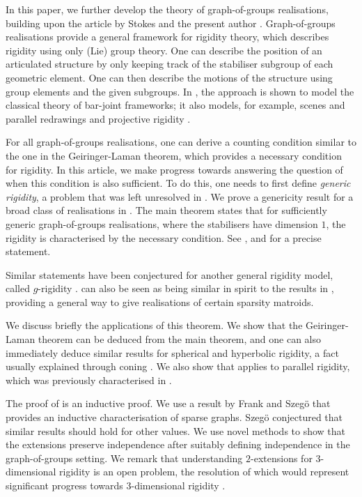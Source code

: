 \documentclass{article}
\theoremstyle{definition}
\theoremstyle{remark}
\begin{document}
In this paper, we further develop the theory of graph-of-groups realisations, building upon the article by Stokes and the present author \cite{graphsofgroups}. Graph-of-groups realisations provide a general framework for rigidity theory, which describes rigidity using only (Lie) group theory. One can describe the position of an articulated structure by only keeping track of the stabiliser subgroup of each geometric element. One can then describe the motions of the structure using group elements and the given subgroups. In \cite{graphsofgroups}, the approach is shown to model the classical theory of bar-joint frameworks; it also models, for example, scenes and parallel redrawings \cite{Whiteley1989} and projective rigidity \cite{https://doi.org/10.48550/arxiv.2407.17836}. 

For all graph-of-groups realisations, one can derive a counting condition similar to the one in the Geiringer-Laman theorem, which provides a necessary condition for rigidity. In this article, we make progress towards answering the question of when this condition is also sufficient. To do this, one needs to first define \textit{generic rigidity}, a problem that was left unresolved in \cite{graphsofgroups}. We prove a genericity result for a broad class of realisations in .
The main theorem states that for sufficiently generic graph-of-groups realisations, where the stabilisers have dimension $1$, the rigidity is characterised by the necessary condition. See , and  for a precise statement. 

Similar statements have been conjectured for another general rigidity model, called $g$-rigidity \cite[Conjecture 4.13]{cruickshank2023identifiability}.   can also be seen as being similar in spirit to the results in \cite{streinu2011natural}, providing a general way to give realisations of certain sparsity matroids. 

We discuss briefly the applications of this theorem. We show that the Geiringer-Laman theorem can be deduced from the main theorem, and one can also immediately deduce similar results for spherical and hyperbolic rigidity, a fact usually explained through coning \cite{whiteley1983cones, schulze2012coning}. We also show that  applies to parallel rigidity, which was previously characterised in \cite{Whiteley1996, develin2007rigidity}.

The proof of  is an inductive proof. We use a result by Frank and Szegö \cite{frank2003constructive} that provides an inductive characterisation of sparse graphs. Szegö \cite{SZEGO20061211} conjectured that similar results should hold for other values. We use novel methods to show that the extensions preserve independence after suitably defining independence in the graph-of-groups setting. We remark that understanding $2$-extensions for $3$-dimensional rigidity is an open problem, the resolution of which would represent significant progress towards $3$-dimensional rigidity \cite{Cruickshank2014, 2022}.
\end{document}
